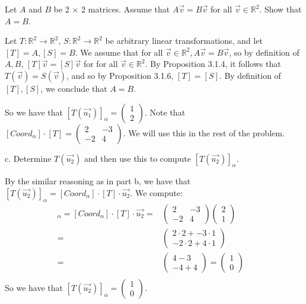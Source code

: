 \documentclass[12pt]{article}
\newenvironment{problem}[2][Problem]
{
	\begin{trivlist} 
		\item[\hskip \labelsep {\bfseries #1 #2:}]
	}
{
	\end{trivlist}
	}
\newenvironment{solution}[1][Solution]
{
	\begin{trivlist} 
		\item[\hskip \labelsep {\itshape #1:}]
	}
	{
	\end{trivlist}
}
\begin{document}
\newpage
\begin{problem}{5}
Let $A$ and $B$ be 2 $\times$ 2 matrices. Assume that $A\vec{v}=B\vec{v}$ for all $\vec{v}\in \mathbb{R}^2$. Show that $A=B$.
\noindent
\newline
\newline

\begin{solution}
Let $T : \mathbb{R}^2 \to \mathbb{R}^2$, $S : \mathbb{R}^2 \to \mathbb{R}^2$ be arbitrary linear transformations, and let $[T]=A,[S]=B$. We assume that for all $\vec{v} \in \mathbb{R}^2, A\vec{v}=B\vec{v}$, so by definition of $A,B$, $[T]\vec{v} = [S]\vec{v}$ for  for all $\vec{v} \in \mathbb{R}^2$. By Proposition 3.1.4, it follows that $T(\vec{v})=S(\vec{v})$, and so by Proposition 3.1.6, $[T]=[S]$. By definition of $[T],[S]$, we conclude that $A=B$.
\end{solution}

\newpage
So we have that $[T(\vec{u_{1}})]_{\alpha}=\begin{pmatrix} 1\\2 \end{pmatrix}$. Note that $[Coord_{\alpha}]\cdot [T] = \begin{pmatrix} 2 & -3 \\-2 & 4 \end{pmatrix}$. We will use this in the rest of the problem.

\noindent
\newline
\newline
c.  Determine $T(\vec{u_{2}})$ and then use this to compute $[T(\vec{u_{2}})]_{\alpha}$.
\begin{solution}
By the similar reasoning as in part b, we have that $[T(\vec{u_{2}})]_{\alpha} = [Coord_{\alpha}]\cdot [T] \cdot \vec{u_{2}}$. We compute:
\begin{align*}
[T(\vec{u_{2}})]_{\alpha} = [Coord_{\alpha}]\cdot [T] \cdot \vec{u_{2}} =& \begin{pmatrix} 2 & -3 \\-2 & 4 \end{pmatrix} \begin{pmatrix}2\\1\end{pmatrix} & \\
=& \begin{pmatrix} 2\cdot 2 + -3\cdot 1 \\-2\cdot 2 + 4\cdot 1 \end{pmatrix} & \\
=& \begin{pmatrix} 4-3 \\-4 + 4\end{pmatrix} = \begin{pmatrix} 1 \\ 0 \end{pmatrix} & \\
\end{align*}
So we have that $[T(\vec{u_{2}})]_{\alpha} = \begin{pmatrix} 1 \\ 0 \end{pmatrix}$. 
\end{solution}


\end{problem}
\end{document}
